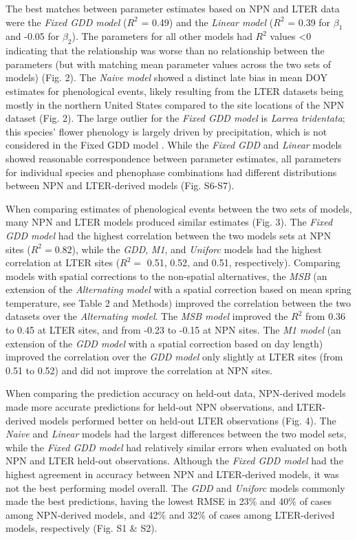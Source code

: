 \documentclass[fleqn,12pt,lineno]{article}
\begin{document}
The best matches between parameter estimates based on NPN and LTER data were the \textit{Fixed GDD model} ($R^2$ = 0.49) and the \textit{Linear model} ($R^2$ = 0.39 for $\beta_{1}$ and -0.05 for $\beta_{2}$). The parameters for all other models had $R^2$ values \textless 0 indicating that the relationship was worse than no relationship between the parameters (but with matching mean parameter values across the two sets of models) (Fig. 2). The \textit{Naive model} showed a distinct late bias in mean DOY estimates for phenological events, likely resulting from the LTER datasets being mostly in the northern United States compared to the site locations of the NPN dataset (Fig. 2). The large outlier for the \textit{Fixed GDD model} is \textit{Larrea tridentata}; this species' flower phenology is largely driven by precipitation, which is not considered in the Fixed GDD model \citep{beatley1974}. While the \textit{Fixed GDD} and \textit{Linear} models showed reasonable correspondence between parameter estimates, all parameters for individual species and phenophase combinations had different distributions between NPN and LTER-derived models (Fig. S6-S7).

When comparing estimates of phenological events between the two sets of models, many NPN and LTER models produced similar estimates (Fig. 3). The \textit{Fixed GDD model} had the highest correlation between the two models sets at NPN sites ($R^2 = 0.82$), while the \textit{GDD}, \textit{M1}, and \textit{Uniforc} models had the highest correlation at LTER sites ($R^2 =$ 0.51, 0.52, and 0.51, respectively). Comparing models with spatial corrections to the non-spatial alternatives, the \textit{MSB} (an extension of the \textit{Alternating model} with a spatial correction based on mean spring temperature, see Table 2 and Methods) improved the correlation between the two datasets over the \textit{Alternating model}. The \textit{MSB model} improved the $R^2$ from 0.36 to 0.45 at LTER sites, and from -0.23 to -0.15 at NPN sites. The \textit{M1 model} (an extension of the \textit{GDD model} with a spatial correction based on day length) improved the correlation over the \textit{GDD model} only slightly at LTER sites (from 0.51 to 0.52) and did not improve the correlation at NPN sites. 

When comparing the prediction accuracy on held-out data, NPN-derived models made more accurate predictions for held-out NPN observations, and LTER-derived models performed better on held-out LTER observations (Fig. 4). The \textit{Naive} and \textit{Linear} models had the largest differences between the two model sets, while the \textit{Fixed GDD model} had relatively similar errors when evaluated on both NPN and LTER held-out observations. Although the \textit{Fixed GDD model} had the highest agreement in accuracy between NPN and LTER-derived models, it was not the best performing model overall. The \textit{GDD} and \textit{Uniforc} models commonly made the best predictions, having the lowest RMSE in 23\% and 40\% of cases among NPN-derived models, and 42\% and 32\% of cases among LTER-derived models, respectively (Fig. S1 \& S2).
\end{document}
